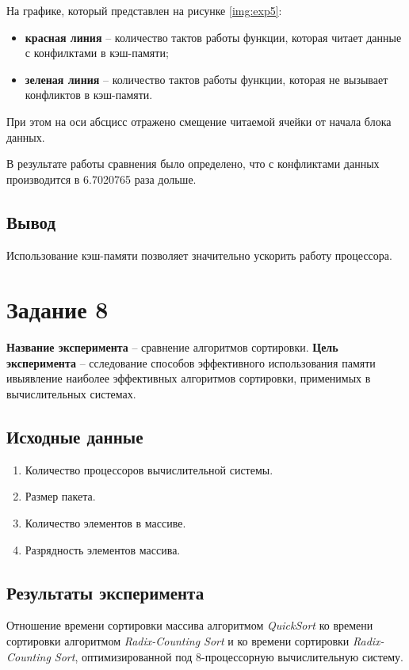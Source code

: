 На графике, который представлен на рисунке \ref{img:exp5}:
\begin{itemize}
    \item \textbf{красная линия} -- количество тактов работы функции, которая
        читает данные с конфилктами в кэш-памяти;
    \item \textbf{зеленая линия} -- количество тактов работы функции, которая
        не вызывает конфликтов в кэш-памяти.
\end{itemize}

При этом на оси абсцисс отражено смещение читаемой ячейки от начала блока
данных.



В результате работы сравнения было определено, что с конфликтами данных
производится в 6.7020765 раза дольше.

\subsection{Вывод}

Использование кэш-памяти позволяет значительно ускорить работу процессора.

\section{Задание 8}

\textbf{Название эксперимента} -- сравнение алгоритмов сортировки.
\textbf{Цель эксперимента} -- сследование способов эффективного использования
памяти ивыявление наиболее эффективных алгоритмов сортировки, применимых в
вычислительных системах.

\subsection{Исходные данные}
\begin{enumerate}
	\item Количество процессоров вычислительной системы.
	\item Размер пакета.
	\item Количество элементов в массиве.
	\item Разрядность элементов массива.
\end{enumerate}

\subsection{Результаты эксперимента}
Отношение времени сортировки массива алгоритмом \textit{QuickSort} ко времени
сортировки алгоритмом \textit{Radix-Counting Sort} и ко времени сортировки
\textit{Radix-Counting Sort}, оптимизированной под 8-процессорную
вычислительную систему.

